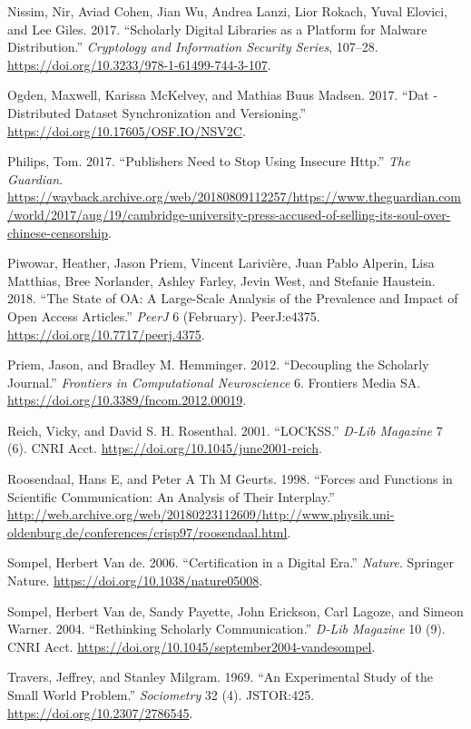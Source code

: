 \documentclass[a4paper]{article}
\begin{document}
\leavevmode\hypertarget{ref-doi:10.3233ux2f978-1-61499-744-3-107}{}%
Nissim, Nir, Aviad Cohen, Jian Wu, Andrea Lanzi, Lior Rokach, Yuval
Elovici, and Lee Giles. 2017. ``Scholarly Digital Libraries as a
Platform for Malware Distribution.'' \emph{Cryptology and Information
Security Series}, 107--28.
\url{https://doi.org/10.3233/978-1-61499-744-3-107}.

\leavevmode\hypertarget{ref-doi:10.17605ux2fOSF.IOux2fNSV2C}{}%
Ogden, Maxwell, Karissa McKelvey, and Mathias Buus Madsen. 2017. ``Dat -
Distributed Dataset Synchronization and Versioning.''
\url{https://doi.org/10.17605/OSF.IO/NSV2C}.

\leavevmode\hypertarget{ref-guardian-cup}{}%
Philips, Tom. 2017. ``Publishers Need to Stop Using Insecure Http.''
\emph{The Guardian}.
\url{https://wayback.archive.org/web/20180809112257/https://www.theguardian.com/world/2017/aug/19/cambridge-university-press-accused-of-selling-its-soul-over-chinese-censorship}.

\leavevmode\hypertarget{ref-doi:10.7717ux2fpeerj.4375}{}%
Piwowar, Heather, Jason Priem, Vincent Larivière, Juan Pablo Alperin,
Lisa Matthias, Bree Norlander, Ashley Farley, Jevin West, and Stefanie
Haustein. 2018. ``The State of OA: A Large-Scale Analysis of the
Prevalence and Impact of Open Access Articles.'' \emph{PeerJ} 6
(February). PeerJ:e4375. \url{https://doi.org/10.7717/peerj.4375}.

\leavevmode\hypertarget{ref-doi:10.3389ux2ffncom.2012.00019}{}%
Priem, Jason, and Bradley M. Hemminger. 2012. ``Decoupling the Scholarly
Journal.'' \emph{Frontiers in Computational Neuroscience} 6. Frontiers
Media SA. \url{https://doi.org/10.3389/fncom.2012.00019}.

\leavevmode\hypertarget{ref-doi:10.1045ux2fjune2001-reich}{}%
Reich, Vicky, and David S. H. Rosenthal. 2001. ``LOCKSS.'' \emph{D-Lib
Magazine} 7 (6). CNRI Acct.
\url{https://doi.org/10.1045/june2001-reich}.

\leavevmode\hypertarget{ref-roosendaal1998}{}%
Roosendaal, Hans E, and Peter A Th M Geurts. 1998. ``Forces and
Functions in Scientific Communication: An Analysis of Their Interplay.''
\url{http://web.archive.org/web/20180223112609/http://www.physik.uni-oldenburg.de/conferences/crisp97/roosendaal.html}.

\leavevmode\hypertarget{ref-doi:10.1038ux2fnature05008}{}%
Sompel, Herbert Van de. 2006. ``Certification in a Digital Era.''
\emph{Nature}. Springer Nature.
\url{https://doi.org/10.1038/nature05008}.

\leavevmode\hypertarget{ref-doi:10.1045ux2fseptember2004-vandesompel}{}%
Sompel, Herbert Van de, Sandy Payette, John Erickson, Carl Lagoze, and
Simeon Warner. 2004. ``Rethinking Scholarly Communication.'' \emph{D-Lib
Magazine} 10 (9). CNRI Acct.
\url{https://doi.org/10.1045/september2004-vandesompel}.

\leavevmode\hypertarget{ref-doi:10.2307ux2f2786545}{}%
Travers, Jeffrey, and Stanley Milgram. 1969. ``An Experimental Study of
the Small World Problem.'' \emph{Sociometry} 32 (4). JSTOR:425.
\url{https://doi.org/10.2307/2786545}.
\end{document}
